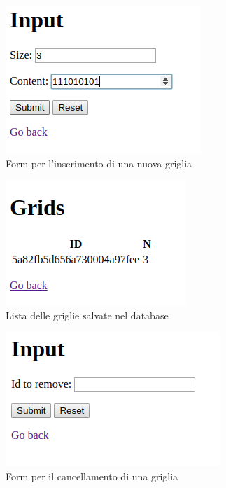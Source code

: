 	\begin{figure}[ht]
	\centering
	\includegraphics[width=0.7\linewidth]{Images/addtable}
	\caption{Form per l'inserimento di una nuova griglia}
	\label{fig:home}
\end{figure}
	\begin{figure}[ht]
	\centering
	\includegraphics[width=0.7\linewidth]{Images/viewgrids}
	\caption{Lista delle griglie salvate nel database}
	\label{fig:home}
\end{figure}
	\begin{figure}[ht]
	\centering
	\includegraphics[width=0.7\linewidth]{Images/rem}
	\caption{Form per il cancellamento di una griglia}
	\label{fig:home}
\end{figure}
\newpage
